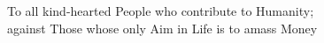 %
%
%
%
%
%
%

\vspace*{3cm}
\begin{center}
    To all kind-hearted People who contribute to Humanity;\\
    against Those whose only Aim in Life is to amass Money
\end{center}
